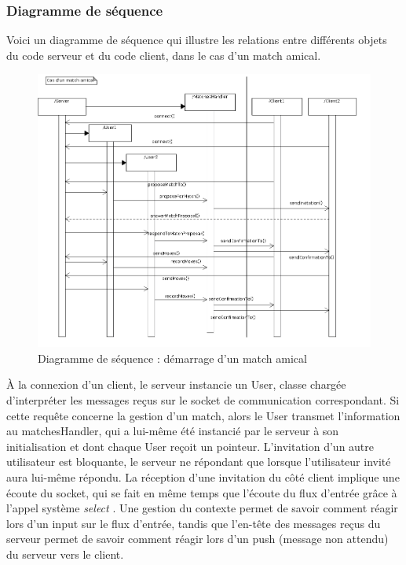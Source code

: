 \documentclass[a4paper,titlepage]{scrreprt}
\begin{document}
\subsubsection{Diagramme de séquence}
  Voici un diagramme de séquence qui illustre les relations entre différents objets du code serveur
  et du code client, dans le cas d'un match amical.
    \begin{figure}[H]
    \center
    \includegraphics[scale=0.4]{uml/Sequence_matchStarting.png}
    \caption{Diagramme de séquence : démarrage d'un match amical}
    \end{figure}
  À la connexion d'un client, le serveur instancie un User, classe chargée d'interpréter
  les messages reçus sur le socket de communication correspondant.
  Si cette requête concerne la gestion d'un match, alors le User transmet l'information
  au matchesHandler, qui a lui-même été instancié par le serveur à son initialisation et dont chaque
  User reçoit un pointeur.
  L'invitation d'un autre utilisateur est bloquante, le serveur ne répondant que
  lorsque l'utilisateur invité aura lui-même répondu. La réception d'une invitation
  du côté client implique une écoute du socket, qui se fait en même temps que l'écoute du flux
  d'entrée grâce à l'appel système \emph{select} . Une gestion du contexte
  permet de savoir comment réagir lors d'un input sur le flux d'entrée, tandis que
  l'en-tête des messages reçus du serveur permet de savoir comment réagir 
  lors d'un push (message non attendu) du serveur
  vers le client.
  
\end{document}
